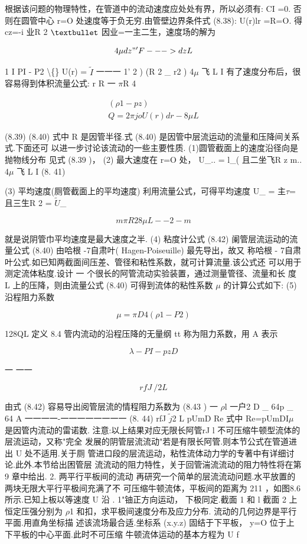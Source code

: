 根据该问题的物理特性，在管道中的流动速度应处处有界，所以必须有: CI =0. 否则在圆管中心 r=O 处速度等于负无穷.由管壁边界条件式 (8.38): U(r)lr =R=O. 得 cz=-i 业R 2 ${\rm •}$ 因业=一主二生，速度场的解为

\[4\mu dz" 'F---> dz L\]

1 I PI - P2 \textbackslash\{\} U(r) = $\tilde{I}$ 一一一 1' 2 ) (R 2 \_ r2 ) 4$\mu$ 飞 L I 有了速度分布后，很容易得到体积流量公式: r R 一 $\pi$R 4

\begin{gather*}
(\rho 1 - pz)\\
Q=2 \pi joU(r)dr-8\mu L
\end{gather*}

(8.39) (8.40) 式中 R 是因管半径.式 (8.40) 是因管中层流运动的流量和压降间关系式.下面还可 以进一步讨论该流动的一些主要性质. (1)圆管截面上的速度沿径向是抛物线分布 见式 (8.39 )， (2) 最大速度在 r=O 处， U\_.. = l\_( 且二坐飞R z m.. 4$\mu$ 飞 L I (8. 41)

(3) 平均速度(厕管截面上的平均速度) 利用流量公式，可得平均速度 U\_ = 主$\tau$= 且三生R 2 = $\tilde{U}$\_

\[m\pi R 2 8 \mu L -- 2- m\]

就是说阴管巾平均速度是最大速度之半. (4) 粘度计公式 (8.42) 阑管层流运动的流量公式 (8.40) 由哈根 -7自肃叶( Hagen-Poiseuille) 最先导出，故又 称哈根 - 7自肃叶公式.如已知两截面间压差、管径和粘性系数，就可计算流量.该公式还 可以用于测定流体粘度.设计 一 个很长的阿管流动实验装置，通过测量管径、流量和长 度 L 上的压降，则由流量公式 (8.40) 可得到流体的粘性系数 $\mu$ 的计算公式如下: (5) 沿程阻力系数

\[\mu =\pi  D4( \rho  1- P2)\]

128QL 定义 8.4 管内流动的沿程压降的无量纲 tt 称为阻力系数，用 A 表示

\[\lambda - PI - pz D\]

一 一一

\[rfJ ~/2 L\]

由式 (8.42) 容易导出阅管层流的情程阻力系数为 (8.43 ) 一 $\rho$l 一户2 D \_ 64p \_ 64 A 一一一一-一一一一一一一一 (8. 44) rfJ $\tilde{j}$2 L pUmD Re 式中 Re=pUmDI$\mu$ 是因管内流动的雷诺数. 注意:以上结果对应无限长阿管rJ l 不可压缩牛顿型流体的层流运动，又称"完全 发展的阴管层流流动"若是有限长阿管.则本节公式在管道进出 U 处不适用.关于厕 管进口段的层流运动，粘性流体动力学的专著中有详细讨论.此外.本节给出困管层 流流动的阻力特性，关于回管湍流流动的阻力特性将在第 9 章中给出. 2. 两平行平板间的流动 再研究一个简单的层流流动问题.水平放置的两块无限大平行平极间充满了不 可压缩牛顿流体，平板间的距离为 211 ，如图8.6 所示.已知上板以等速度 U 沿 . 1"铀正方向运动， 下极同定.截面 1 和 l 截面 2 上恒定压强分别为 $\rho$1 和扣，求平极间速度分布及应力分布. 流动的几何边界是平行平面.用直角坐标描 述该流场最合适.坐标系 (x.y.z) 固结于下平板， y=O 位于上下平板的中心平面.此时不可压缩 牛顿流体运动的基本方程为 U f


